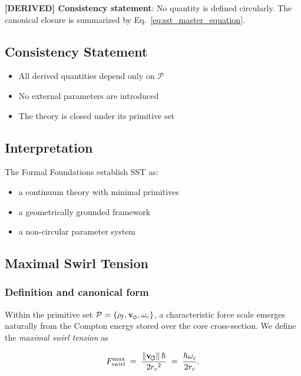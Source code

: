 \documentclass[11pt]{article}
\theoremstyle{definition}
\theoremstyle{plain}
\theoremstyle{remark}
\newcommand{\swirlarrow}{\mathchoice{\mkern-2mu\scriptstyle\boldsymbol{\circlearrowleft}}{\mkern-2mu\scriptstyle\boldsymbol{\circlearrowleft}}{\mkern-2mu\scriptscriptstyle\boldsymbol{\circlearrowleft}}{\mkern-2mu\scriptscriptstyle\boldsymbol{\circlearrowleft}}}
\newcommand{\vswirl}{\mathbf{v}_{\swirlarrow}}
\newcommand{\rhoF}{{\rho_{\!f}}}
\newcommand{\rc}{{r_c}}
\newcommand{\vnorm}{\lVert \mathbf{v}_{\!\boldsymbol{\circlearrowleft}} \rVert}
\begin{document}
        \textbf{[DERIVED] Consistency statement}:
        No quantity is defined circularly. The canonical closure is summarized by Eq.~\ref{eq:sst_master_equation}.
    
    \subsection{Consistency Statement}
        
        \begin{itemize}
            \item All derived quantities depend only on $\mathcal{P}$
            \item No external parameters are introduced
            \item The theory is closed under its primitive set
        \end{itemize}
    
    \subsection{Interpretation}
        
        The Formal Foundations establish SST as:
        
        \begin{itemize}
            \item a continuum theory with minimal primitives
            \item a geometrically grounded framework
            \item a non-circular parameter system
        \end{itemize}

    \subsection{Maximal Swirl Tension}
    \label{sec:Fmax}

        \subsubsection{Definition and canonical form}

        Within the primitive set $\mathcal{P} = \{\rhoF, \vswirl, \omega_c\}$, a characteristic force scale emerges naturally from the Compton energy stored over the core cross-section. We define the \emph{maximal swirl tension} as

        \begin{align}
            F_{\rm swirl}^{\max}
            \;=\; \frac{\vnorm\,\hbar}{2\rc^2}
            \;=\; \frac{\hbar\omega_c}{2\rc}.
            \label{eq:Fmax_def}
        \end{align}
\end{document}
